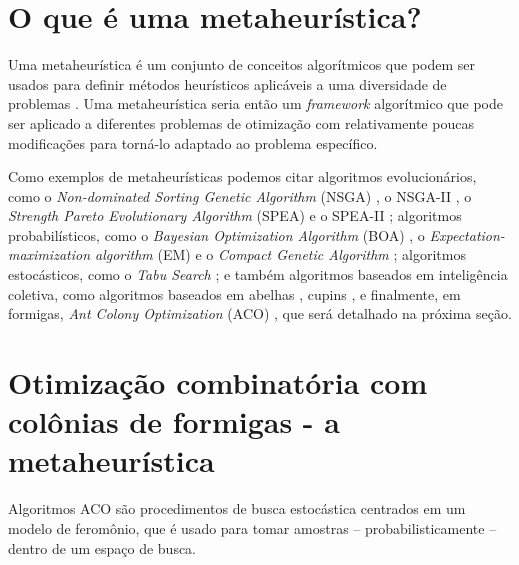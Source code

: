 \section{O que é uma metaheurística?}
Uma metaheurística é um conjunto de conceitos algorítmicos que podem ser usados
para definir métodos heurísticos aplicáveis a uma diversidade de problemas
\cite{975277}. Uma metaheurística seria então um \textit{framework} algorítmico
que pode ser aplicado a diferentes problemas de otimização com relativamente
poucas modificações para torná-lo adaptado ao problema específico.

Como exemplos de metaheurísticas podemos citar algoritmos evolucionários, como
o \textit{Non-dominated Sorting Genetic Algorithm} (NSGA)
\cite{Srinivas94multiobjectiveoptimization}, o NSGA-II \cite{deb2002fast}, o
\textit{Strength Pareto Evolutionary Algorithm} (SPEA)
\cite{zitzler1998evolutionary} e o SPEA-II \cite{zitzler2001spea2}; algoritmos
probabilísticos, como o \textit{Bayesian Optimization Algorithm} (BOA)
\cite{Cantu-Paz98linkageproblem}, o \textit{Expectation-maximization
algorithm} (EM) \cite{moon1996expectation} e o \textit{Compact Genetic
Algorithm} \cite{harik1998compact}; algoritmos estocásticos, como o
\textit{Tabu Search} \cite{glover1990tabu}; e também algoritmos baseados em
inteligência coletiva, como algoritmos baseados em abelhas
\cite{teodorovic2005bee}, cupins \cite{roth2003termite}, e finalmente, em
formigas, \textit{Ant Colony Optimization} (ACO) \cite{dorigo1992optimization},
que será detalhado na próxima seção.

\section{Otimização combinatória com colônias de formigas - a metaheurística}
\label{sec:atsp}
Algoritmos ACO são procedimentos de busca
estocástica centrados em um modelo de feromônio, que é usado para tomar
amostras -- probabilisticamente -- dentro de um espaço de busca.


